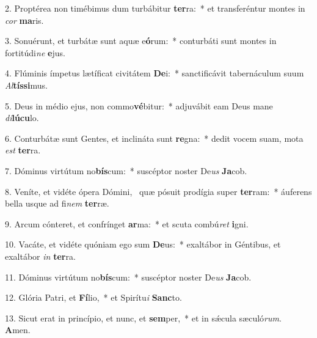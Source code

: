 2. Proptérea non timébimus dum turbábitur \textbf{ter}ra:~*  et transferéntur montes in \textit{cor} \textbf{ma}ris.\

3. Sonuérunt, et turbátæ sunt aquæ e\textbf{ó}rum:~*  conturbáti sunt montes in fortitúdi\textit{ne} \textbf{e}jus.\

4. Flúminis ímpetus lætíficat civitátem \textbf{De}i:~*  sanctificávit tabernáculum suum \textit{Al}\textbf{tís}\textbf{si}mus.\

5. Deus in médio ejus, non commo\textbf{vé}bitur:~*  adjuvábit eam Deus mane \textit{di}\textbf{lú}\textbf{cu}lo.\

6. Conturbátæ sunt Gentes, et inclináta sunt \textbf{re}gna:~*  dedit vocem suam, mota \textit{est} \textbf{ter}ra.\

7. Dóminus virtútum no\textbf{bís}cum:~*  suscéptor noster De\textit{us} \textbf{Ja}cob.\

8. Veníte, et vidéte ópera Dómini, \dag\  quæ pósuit prodígia super \textbf{ter}ram:~*  áuferens bella usque ad fi\textit{nem} \textbf{ter}ræ.\

9. Arcum cónteret, et confrínget \textbf{ar}ma:~*  et scuta combú\textit{ret} \textbf{i}gni.\

10. Vacáte, et vidéte quóniam ego sum \textbf{De}us:~*  exaltábor in Géntibus, et exaltábor \textit{in} \textbf{ter}ra.\

11. Dóminus virtútum no\textbf{bís}cum:~*  suscéptor noster De\textit{us} \textbf{Ja}cob.\

12. Glória Patri, et \textbf{Fí}lio,~*  et Spirítu\textit{i} \textbf{Sanc}to.\

13. Sicut erat in princípio, et nunc, et \textbf{sem}per,~*  et in sǽcula sæculó\textit{rum}. \textbf{A}men.\

